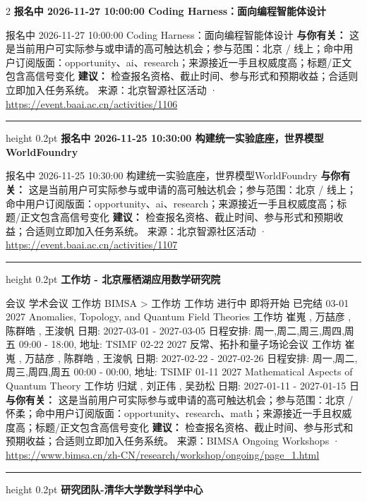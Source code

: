 \documentclass[10.5pt]{ctexart}
\begin{document}
\begin{multicols}{2}
{\large\bfseries 报名中 2026-11-27 10:00:00 Coding Harness：面向编程智能体设计}\par
报名中 2026-11-27 10:00:00 Coding Harness：面向编程智能体设计
\textbf{与你有关：} 这是当前用户可实际参与或申请的高可触达机会；参与范围：北京 / 线上；命中用户订阅版面：opportunity、ai、research；来源接近一手且权威度高；标题/正文包含高信号变化
\textbf{建议：} 检查报名资格、截止时间、参与形式和预期收益；合适则立即加入任务系统。
{\footnotesize\color{ormuted} 来源：北京智源社区活动 · \url{https://event.baai.ac.cn/activities/1106}}
\vspace{2mm}
\hrule height 0.2pt
\vspace{2mm}
{\large\bfseries 报名中 2026-11-25 10:30:00 构建统一实验底座，世界模型WorldFoundry}\par
报名中 2026-11-25 10:30:00 构建统一实验底座，世界模型WorldFoundry
\textbf{与你有关：} 这是当前用户可实际参与或申请的高可触达机会；参与范围：北京 / 线上；命中用户订阅版面：opportunity、ai、research；来源接近一手且权威度高；标题/正文包含高信号变化
\textbf{建议：} 检查报名资格、截止时间、参与形式和预期收益；合适则立即加入任务系统。
{\footnotesize\color{ormuted} 来源：北京智源社区活动 · \url{https://event.baai.ac.cn/activities/1107}}
\vspace{2mm}
\hrule height 0.2pt
\vspace{2mm}
{\large\bfseries 工作坊 - 北京雁栖湖应用数学研究院}\par
会议 学术会议 工作坊 BIMSA > 工作坊 工作坊 进行中 即将开始 已完结 03-01 2027 Anomalies, Topology, and Quantum Field Theories 工作坊 崔嵬 , 万喆彦 , 陈群皓 , 王浚帆 日期: 2027-03-01 - 2027-03-05 日程安排: 周一,周二,周三,周四,周五 09:00 - 18:00, 地址: TSIMF 02-22 2027 反常、拓扑和量子场论会议 工作坊 崔嵬 , 万喆彦 , 陈群皓 , 王浚帆 日期: 2027-02-22 - 2027-02-26 日程安排: 周一,周二,周三,周四,周五 00:00 - 00:00, 地址: TSIMF 01-11 2027 Mathematical Aspects of Quantum Theory 工作坊 归斌 , 刘正伟 , 吴劲松 日期: 2027-01-11 - 2027-01-15 日
\textbf{与你有关：} 这是当前用户可实际参与或申请的高可触达机会；参与范围：北京 / 怀柔；命中用户订阅版面：opportunity、research、math；来源接近一手且权威度高；标题/正文包含高信号变化
\textbf{建议：} 检查报名资格、截止时间、参与形式和预期收益；合适则立即加入任务系统。
{\footnotesize\color{ormuted} 来源：BIMSA Ongoing Workshops · \url{https://www.bimsa.cn/zh-CN/research/workshop/ongoing/page_1.html}}
\vspace{2mm}
\hrule height 0.2pt
\vspace{2mm}
{\large\bfseries 研究团队-清华大学数学科学中心}\par

\end{multicols}
\end{document}
